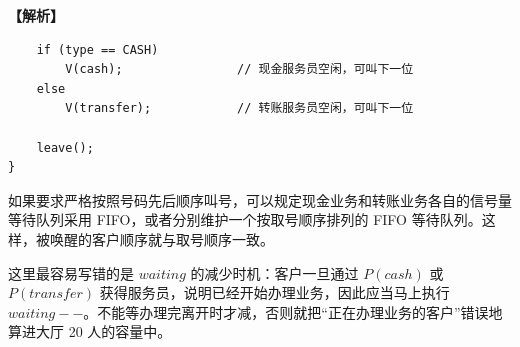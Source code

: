 \documentclass[UTF8,12pt]{ctexart}
\newenvironment{explanation}{\par\noindent\textbf{【解析】}\par\smallskip}{\par\medskip}
\begin{document}
\begin{explanation}
\begin{lstlisting}
    if (type == CASH)
        V(cash);                // 现金服务员空闲，可叫下一位
    else
        V(transfer);            // 转账服务员空闲，可叫下一位

    leave();
}
\end{lstlisting}

如果要求严格按照号码先后顺序叫号，可以规定现金业务和转账业务各自的信号量等待队列采用 FIFO，或者分别维护一个按取号顺序排列的 FIFO 等待队列。这样，被唤醒的客户顺序就与取号顺序一致。

这里最容易写错的是 $waiting$ 的减少时机：客户一旦通过 $P(cash)$ 或 $P(transfer)$ 获得服务员，说明已经开始办理业务，因此应当马上执行 $waiting--$。不能等办理完离开时才减，否则就把“正在办理业务的客户”错误地算进大厅 20 人的容量中。
\end{explanation}
\end{document}
